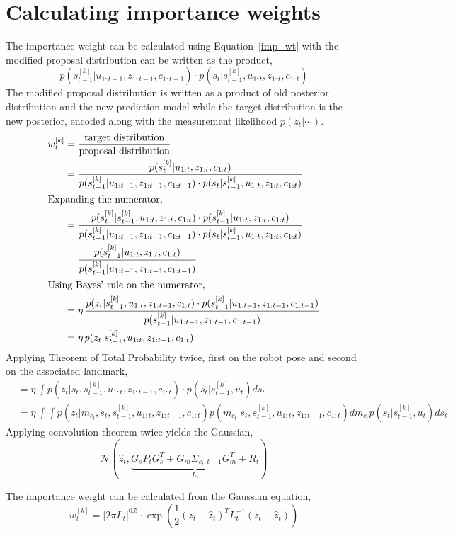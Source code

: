 \section*{Calculating importance weights}
The importance weight \cite{monte2002phd} can be calculated using Equation~\ref{imp_wt} with the modified proposal distribution can be written as the product,
\begin{equation}
p(s^{[k]}_{t-1}|u_{1:t-1},z_{1:t-1},c_{1:t-1})\cdot p(s_t|s^{[k]}_{t-1},u_{1:t},z_{1:t},c_{1:t})
\end{equation}
The modified proposal distribution is written as a product of old posterior distribution and the new prediction model while the target distribution is the new posterior, encoded along with the measurement likelihood $p(z_t|\cdots)$. 
\begin{align*}
w^{[k]}_t &= \frac{\text{target distribution}}{\text{proposal distribution}} \\
&= \frac{p(s^{[k]}_{t}|u_{1:t},z_{1:t},c_{1:t})}{p(s^{[k]}_{t-1}|u_{1:t-1},z_{1:t-1},c_{1:t-1})\cdot p(s_t|s^{[k]}_{t-1},u_{1:t},z_{1:t},c_{1:t})} \\
\intertext{Expanding the numerator,}
&=\frac{p(s^{[k]}_{t}|s^{[k]}_{t-1},u_{1:t},z_{1:t},c_{1:t})\cdot p(s^{[k]}_{t-1}|u_{1:t},z_{1:t},c_{1:t})}{p(s^{[k]}_{t-1}|u_{1:t-1},z_{1:t-1},c_{1:t-1})\cdot p(s_t|s^{[k]}_{t-1},u_{1:t},z_{1:t},c_{1:t})} \\
&=\frac{p(s^{[k]}_{t-1}|u_{1:t},z_{1:t},c_{1:t})}{p(s^{[k]}_{t-1}|u_{1:t-1},z_{1:t-1},c_{1:t-1})} \\
\intertext{Using Bayes' rule on the numerator,}
&=\eta\,\frac{p(z_t|s^{[k]}_{t-1},u_{1:t},z_{1:t-1},c_{1:t})\cdot p(s^{[k]}_{t-1}|u_{1:t-1},z_{1:t-1},c_{1:t-1})}{p(s^{[k]}_{t-1}|u_{1:t-1},z_{1:t-1},c_{1:t-1})} \\
&=\eta\,p(z_t|s^{[k]}_{t-1},u_{1:t},z_{1:t-1},c_{1:t})
\end{align*}
Applying Theorem of Total Probability twice, first on the robot pose and second on the associated landmark,
\begin{align*}
&=\eta\,\int p(z_t|s_t,s^{[k]}_{t-1},u_{1:t},z_{1:t-1},c_{1:t})\cdot p(s_t|s^{[k]}_{t-1},u_t)ds_t \\
&=\eta\,\int\int p(z_t|m_{c_t},s_t,s^{[k]}_{t-1},u_{1:t},z_{1:t-1},c_{1:t})p(m_{c_t}|s_t,s^{[k]}_{t-1},u_{1:t},z_{1:t-1},c_{1:t})dm_{c_t}p(s_t|s^{[k]}_{t-1},u_t)ds_t
\end{align*}
Applying convolution theorem twice yields the Gaussian,
\begin{equation}
\mathcal{N}\left(\hat{z}_t,\underbrace{G_sP_tG_s^T+G_{m}\Sigma_{c_t,t-1}G^T_{m}+R_t}_{L_t}\right)
\end{equation}

The importance weight can be calculated from the Gaussian equation,
\begin{equation}
w^{[k]}_t=|2\pi L_t|^{0.5}\cdot \exp\left(\frac{1}{2}\left(z_t-\hat{z}_t\right)^TL^{-1}_t\left(z_t-\hat{z}_t\right)\right)
\label{mod_weight}
\end{equation}